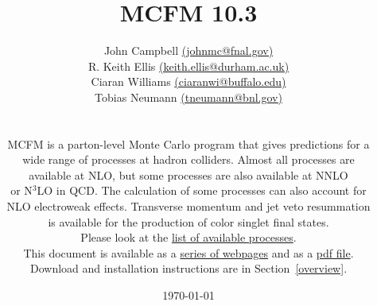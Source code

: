 \documentclass{book}
\begin{document}
\title{{\LARGE \bf MCFM 10.3} \\[1cm]}
\author{
  {John Campbell \href{mailto:johnmc@fnal.gov}{(johnmc@fnal.gov)}} \\[0.2cm]
  {R. Keith Ellis \href{mailto:keith.ellis@durham.ac.uk}{(keith.ellis@durham.ac.uk)}} \\[0.2cm]
  {Ciaran Williams \href{mailto:ciaranwi@buffalo.edu}{(ciaranwi@buffalo.edu)}} \\[0.2cm]
  {Tobias Neumann \href{mailto:tneumann@bnl.gov}{(tneumann@bnl.gov)}} \\[3.0cm] \\
{\begin{tabular}{l}
MCFM is a parton-level Monte Carlo program that gives predictions for a \\
wide range of processes at hadron colliders. Almost all processes are \\
available at NLO, but some processes are also available at NNLO \\
or N$^3$LO in QCD. The calculation of some processes can also account for \\
NLO electroweak effects. Transverse momentum and jet veto resummation \\
is available for the production of color singlet final states. \\
Please look at the {\href{\mcfmprocs/proclist.html}{list of available processes}}.\\
This document is available as a {\href{\mcfmweb}{series of webpages}} and as a {\href{\mcfmpdf}{pdf file}}.\\
Download and installation instructions are in Section~\ref{overview}.
\end{tabular}}}

\date{\today}

\maketitle

\ifdefined\HCode\else\tableofcontents\fi



\cleardoublepage
{}


\end{document}
